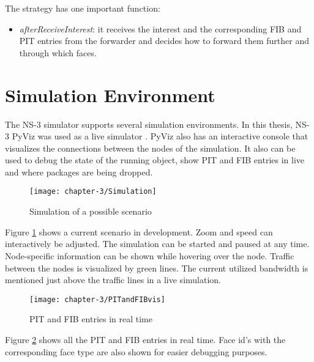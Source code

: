 The strategy has one important function:

\begin{itemize}
\item \emph{afterReceiveInterest}: it receives the interest and the corresponding FIB and PIT entries from the forwarder and decides how to forward them further and through which faces.
\end{itemize}


\section{Simulation Environment}

The NS-3 simulator supports several simulation environments. In this thesis, NS-3 PyViz was used as a live simulator \cite{pyviz}. PyViz also has an interactive console that visualizes the connections between the nodes of the simulation. It also can be used to debug the state of the running object, show PIT and FIB entries in live and where packages are being dropped.

\vspace{5mm} %

\begin{figure}[H]
  \centering
  \texttt{[image: chapter-3/Simulation]}
  \caption{Simulation of a possible scenario}
  \label{fig:Simulation}
\end{figure}

\vspace{5mm} %

Figure \ref{fig:Simulation} shows a current scenario in development. Zoom and speed can interactively be adjusted. The simulation can be started and paused at any time. Node-specific information can be shown while hovering over the node. Traffic between the nodes is visualized by green lines. The current utilized bandwidth is mentioned just above the traffic lines in a live simulation.

\vspace{5mm} %

\begin{figure}[H]
  \centering
  \texttt{[image: chapter-3/PITandFIBvis]}
  \caption{PIT and FIB entries in real time}
  \label{fig:PITandFIBvis}
\end{figure}

\vspace{5mm} %

Figure \ref{fig:PITandFIBvis} shows all the PIT and FIB entries in real time. Face id's with the corresponding face type are also shown for easier debugging purposes.

